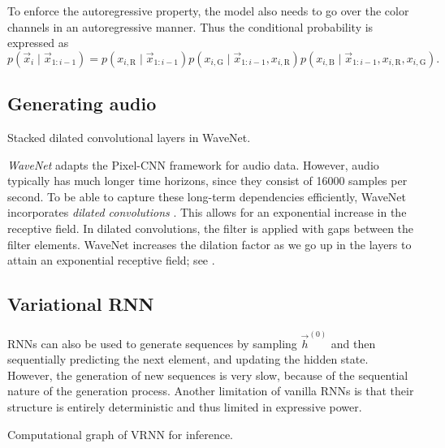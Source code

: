 To enforce the autoregressive property, the model also needs to go over the color channels in an
autoregressive manner. Thus the conditional probability is expressed as \[
    p(\vec{x}_i \mid \vec{x}_{1:i-1}) = p(x_{i,\mathrm{R}} \mid \vec{x}_{1:i-1}) p(x_{i,\mathrm{G}} \mid \vec{x}_{1:i-1}, x_{i,\mathrm{R}}) p(x_{i,\mathrm{B}} \mid \vec{x}_{1:i-1}, x_{i,\mathrm{R}}, x_{i,\mathrm{G}}).
\]

\subsection{Generating audio}

\begin{marginfigure}
    \centering
    \caption{Stacked dilated convolutional layers in WaveNet.}
    \label{fig:dilated-convolutions}
\end{marginfigure}

\textit{WaveNet} \citep{oord2016wavenet} adapts the Pixel-CNN framework for audio data. However,
audio typically has much longer time horizons, since they consist of 16000 samples per second. To be
able to capture these long-term dependencies efficiently, WaveNet incorporates \textit{dilated
    convolutions} \citep{yu2016multiscale}. This allows for an exponential increase in the receptive
field. In dilated convolutions, the filter is applied with gaps between the filter elements. WaveNet
increases the dilation factor as we go up in the layers to attain an exponential receptive field; see
.

\subsection{Variational RNN}

RNNs can also be used to generate sequences by sampling $\vec{h}^{(0)}$ and then sequentially
predicting the next element, and updating the hidden state. However, the generation of new
sequences is very slow, because of the sequential nature of the generation process. Another
limitation of vanilla RNNs is that their structure is entirely deterministic and thus limited in
expressive power.

\begin{marginfigure}
    \centering
    \caption{Computational graph of VRNN for inference.}
    \label{fig:vrnn-inference}
\end{marginfigure}

